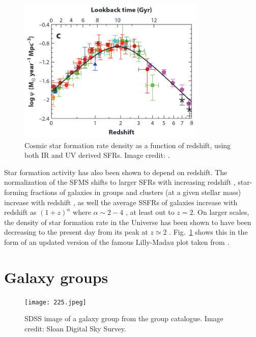 \begin{figure}[!ht]
  \centering
  \includegraphics[width=0.8\textwidth]{lilly_madau.png}
  \caption[Cosmic SFR density versus redshift]{Cosmic star formation
    rate density as a function of 
    redshift, using both IR and UV derived SFRs.  Image credit:
    \citet{madau2014}.}
  \label{fig:lilly_madau}
\end{figure}

Star formation activity has also been shown to depend on redshift.
The normalization of the SFMS shifts to larger SFRs with increasing
redshift \citep{karim2011, whitaker2012, lee2015, erfanianfar2016},
star-forming fractions of galaxies in groups and clusters (at a given
stellar mass) increase with redshift \citep{mcgee2011, hou2013,
  nantais2013}, as well the average SSFRs of galaxies increase with
redshift as $(1+z)^\alpha$ where $\alpha \sim 2-4$
\citep{oliver2010, whitaker2012}, at least out to $z=2$.  On larger
scales, the density of star formation rate in the Universe has been
shown to have been decreasing to the present day from its peak at $z
\simeq 2$ \citep[e.g.][]{madau1998, madau2014}.
Fig.~\ref{fig:lilly_madau} shows this in the form of an updated
version of the famous Lilly-Madau plot taken from \citet{madau2014}.

\section{Galaxy groups}
\label{sec:groups}

\begin{figure}[!ht]
  \centering
  \texttt{[image: 225.jpeg]}
  \caption[SDSS image of a galaxy group from the \citet{yang2007}
    group catalogue]{SDSS image of a galaxy group from the \citet{yang2007}
    group catalogue.  Image credit: Sloan Digital Sky Survey.}
  \label{fig:sdss_225}
\end{figure}


